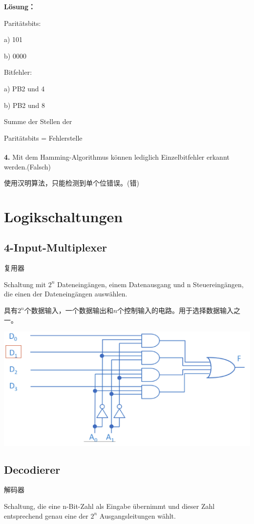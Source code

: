 \documentclass[fleqn]{article}
\begin{document}
\textbf{Lösung：}

Paritätsbits:

a) 101

b) 0000

Bitfehler:

a) PB2 und 4

b) PB2 und 8

Summe der Stellen der

Paritätsbits = Fehlerstelle
\\
\\
\noindent\textbf{4.} Mit dem Hamming-Algorithmus können lediglich Einzelbitfehler erkannt werden.(Falsch)

使用汉明算法，只能检测到单个位错误。(错)

\section{Logikschaltungen}

\subsection{4-Input-Multiplexer} 复用器

Schaltung mit $2^n$ Dateneingängen, einem Datenausgang und n Steuereingängen, die einen der Dateneingängen auswählen.

具有$2^n$个数据输入，一个数据输出和$n$个控制输入的电路。用于选择数据输入之一。

\begin{center}
    \includegraphics[scale=0.6]{2.png}
\end{center}

\subsection{Decodierer} 解码器

Schaltung, die eine n-Bit-Zahl als Eingabe übernimmt und dieser Zahl entsprechend genau eine der $2^n$ Ausgangsleitungen wählt.
\end{document}
